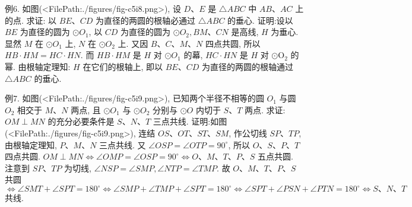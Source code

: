 例6. 如图(<FilePath:./figures/fig-c5i8.png>), 设 $D 、 E$ 是 $\triangle A B C$ 中 $A B 、 A C$ 上的点.
求证: 以 $B E 、 C D$ 为直径的两圆的根轴必通过 $\triangle A B C$ 的垂心.
证明:设以 $B E$ 为直径的圆为 $\odot O_1$, 以 $C D$ 为直径的圆为 $\odot O_2, B M 、 C N$ 是高线, $H$ 为垂心.
显然 $M$ 在 $\odot O_1$ 上, $N$ 在 $\odot O_2$ 上.
又因 $B 、 C 、 M 、 N$ 四点共圆, 所以 $H B \cdot H M= H C \cdot H N$.
而 $H B \cdot H M$ 是 $H$ 对 $\odot O_1$ 的幕, $H C \cdot H N$ 是 $H$ 对 $\odot \mathrm{O}_2$ 的幂.
由根轴定理知: $H$ 在它们的根轴上, 即以 $B E 、 C D$ 为直径的两圆的根轴通过 $\triangle A B C$ 的垂心.



例7. 如图(<FilePath:./figures/fig-c5i9.png>), 已知两个半径不相等的圆 $O_1$ 与圆 $O_2$ 相交于 $M 、 N$ 两点, 且 $\odot O_1$ 与 $\odot O_2$ 分别与 $\odot O$ 内切于 $S 、 T$ 两点.
求证: $O M \perp M N$ 的充分必要条件是 $S 、 N 、 T$ 三点共线.
证明:如图(<FilePath:./figures/fig-c5i9.png>), 连结 $O S 、 O T 、 S T 、 S M$, 作公切线 $S P 、 T P$, 由根轴定理知, $P 、 M 、 N$ 三点共线.
又 $\angle O S P=\angle O T P=90^{\circ}$, 所以 $O 、 S 、 P 、 T$ 四点共圆.
$O M \perp M N \Leftrightarrow \angle O M P=\angle O S P=90^{\circ} \Leftrightarrow O 、 M 、 T 、 P 、 S$ 五点共圆.
注意到 $S P 、 T P$ 为切线, $\angle N S P=\angle S M P, \angle N T P=\angle T M P$.
故 $O 、 M 、 T 、 P 、 S$ 共圆 $\Leftrightarrow \angle S M T+\angle S P T=180^{\circ} \Leftrightarrow \angle S M P+\angle T M P+ \angle S P T=180^{\circ} \Leftrightarrow \angle S P T+\angle P S N+\angle P T N=180^{\circ} \Leftrightarrow S 、 N 、 T$ 共线.



